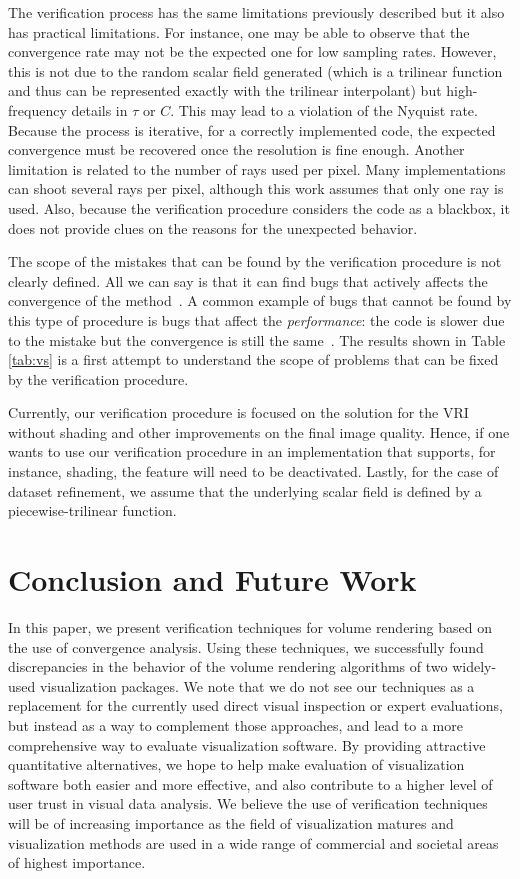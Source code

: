 The verification process has the same limitations previously described
but it also has practical limitations. For instance, one may be able
to observe that the convergence rate may not be the expected one for
low sampling rates. However, this is not due to the random scalar
field generated (which is a trilinear function and thus can be
represented exactly with the trilinear interpolant) but
high-frequency details in $\tau$ or $C$. This may lead to a violation
of the Nyquist rate. Because the process is iterative, for a correctly
implemented code, the expected convergence must be recovered once the
resolution is fine enough.  Another limitation is related to the number of
rays used per pixel. Many implementations can shoot several rays per
pixel, although this work assumes that only one ray is used. Also,
because the verification procedure considers the code as a blackbox,
it does not provide clues on the reasons for the unexpected behavior.

The scope of the mistakes that can be found by the verification
procedure is not clearly defined. All we can say is that it can find
bugs that actively affects the convergence of the
method~\cite{KnuppSalari02}. A common example of bugs that cannot be
found by this type of procedure is bugs that affect the
\emph{performance}: the code is slower due to the mistake but the
convergence is still the same~\cite{roach98}. The results shown in
Table \ref{tab:vs} is a first attempt to understand the scope of problems
that can be fixed by the verification procedure.

Currently, our verification procedure is focused on the solution for
the VRI without shading and other improvements on the final image
quality. Hence, if one wants to use our verification procedure in an
implementation that supports, for instance, shading, the feature will
need to be deactivated. Lastly, for the case of dataset refinement, we
assume that the underlying scalar field is defined by a piecewise-trilinear
function.

\section{Conclusion and Future Work}
\label{sec:conclusion}

In this paper, we present verification techniques for volume rendering
based on the use of convergence analysis. Using these techniques, we
successfully found discrepancies in the behavior of the volume
rendering algorithms of two widely-used visualization packages.  We
note that we do not see our techniques as a replacement for the
currently used direct visual inspection or expert evaluations, but
instead as a way to complement those approaches, and lead to a more
comprehensive way to evaluate visualization software.  By providing
attractive quantitative alternatives, we hope to help make evaluation
of visualization software both easier and more effective, and also
contribute to a higher level of user trust in visual data analysis. We
believe the use of verification techniques will be of increasing
importance as the field of visualization matures and visualization
methods are used in a wide range of commercial and societal areas of
highest importance.

